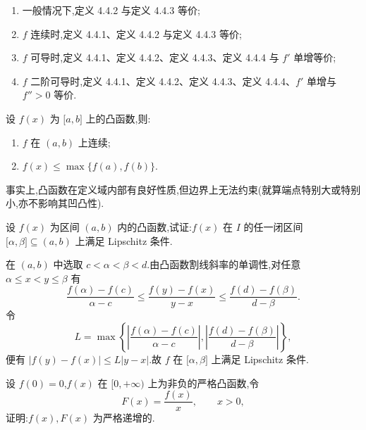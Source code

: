 \begin{theorem}[\markstar]
    \begin{enumerate}
        \item 一般情况下,定义 4.4.2 与定义 4.4.3 等价;
        \item $f$ 连续时,定义 4.4.1、定义 4.4.2 与定义 4.4.3 等价;
        \item $f$ 可导时,定义 4.4.1、定义 4.4.2、定义 4.4.3、定义 4.4.4 与 $f'$ 单增等价;
        \item $f$ 二阶可导时,定义 4.4.1、定义 4.4.2、定义 4.4.3、定义 4.4.4、$f'$ 单增与 $f''>0$ 等价.
    \end{enumerate}
\end{theorem}

\begin{theorem}[\markstar]
    设 $f(x)$ 为 $\lbrack a,b\rbrack$ 上的凸函数,则:
    \begin{enumerate}
        \item $f$ 在 $(a,b)$ 上连续;
        \item $f(x)\leq\max\{f(a),f(b)\}$.
    \end{enumerate}
\end{theorem}

\begin{remark}
    事实上,凸函数在定义域内部有良好性质,但边界上无法约束(就算端点特别大或特别小,亦不影响其凹凸性).
\end{remark}

\begin{example}
    设 $f(x)$ 为区间 $(a,b)$ 内的凸函数,试证:$f(x)$ 在 $I$ 的任一闭区间 $\lbrack \alpha,\beta\rbrack\subseteq(a,b)$ 上满足 Lipschitz 条件.
\end{example}
\exampleblank

\begin{solution}
    在 $(a,b)$ 中选取 $c<\alpha<\beta<d$.由凸函数割线斜率的单调性,对任意 $\alpha\leq x<y\leq\beta$ 有
    \[
        \dfrac{f(\alpha)-f(c)}{\alpha-c}
        \leq\dfrac{f(y)-f(x)}{y-x}
        \leq\dfrac{f(d)-f(\beta)}{d-\beta}.
    \]
    令
    \[
        L=\max\left\{
        \left|\dfrac{f(\alpha)-f(c)}{\alpha-c}\right|,
        \left|\dfrac{f(d)-f(\beta)}{d-\beta}\right|
        \right\},
    \]
    便有 $|f(y)-f(x)|\leq L|y-x|$.故 $f$ 在 $\lbrack\alpha,\beta\rbrack$ 上满足 Lipschitz 条件.
\end{solution}

\begin{example}
    设 $f(0)=0$,$f(x)$ 在 $\lbrack 0,+\infty)$ 上为非负的严格凸函数,令
    \[
        F(x)=\dfrac{f(x)}{x},\qquad x>0,
    \]
    证明:$f(x),F(x)$ 为严格递增的.
\end{example}
\exampleblank

